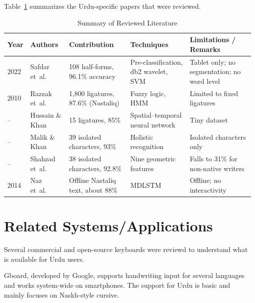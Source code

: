 \documentclass[12pt,a4paper]{report}
\newcommand{\todo}[1]{\textcolor{red}{[#1]}}
\begin{document}
Table~\ref{tab:lit} summarizes the Urdu-specific papers that were reviewed.

\begin{table}[H]
\caption{Summary of Reviewed Literature}\label{tab:lit}
\centering\small\renewcommand{\arraystretch}{1.15}
\begin{tabular}{|p{0.4in}|p{0.95in}|p{1.1in}|p{1.15in}|p{1.4in}|}
\hline
\textbf{Year} & \textbf{Authors} & \textbf{Contribution} & \textbf{Techniques} & \textbf{Limitations / Remarks}\\\hline
2022 & Safdar et~al.\ & 108 half-forms, 96.1\% accuracy & Pre-classification, db2 wavelet, SVM & Tablet only; no segmentation; no word level\\\hline
2010 & Razzak et~al.\ & 1,800 ligatures, 87.6\% (Nastaliq) & Fuzzy logic, HMM & Limited to fixed ligatures\\\hline
-- & Hussain \& Khan & 15 ligatures, 85\% & Spatial--temporal neural network & Tiny dataset\\\hline
-- & Malik \& Khan & 39 isolated characters, 93\% & Holistic recognition & Isolated characters only\\\hline
-- & Shahzad et~al.\ & 38 isolated characters, 92.8\% & Nine geometric features & Falls to 31\% for non-native writers\\\hline
2014 & Naz et~al.\ & Offline Nastaliq text, about 88\% & MDLSTM & Offline; no interactivity\\\hline
\end{tabular}
\end{table}

\section{Related Systems/Applications}
Several commercial and open-source keyboards were reviewd to understand what is available for Urdu users.

Gboard, developed by Google, supports handwriting input for several languages and works system-wide on smartphones. The support for Urdu is basic and mainly focuses on Naskh-style cursive.
\end{document}
